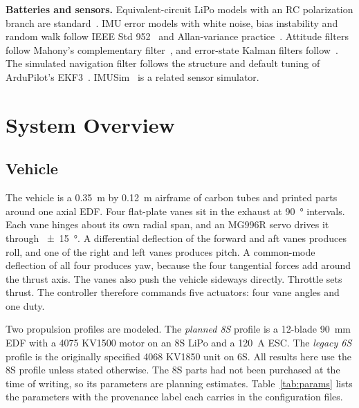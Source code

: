 \documentclass[journal]{IEEEtran}
\newcommand{\reftab}[1]{Table~\ref{#1}}
\begin{document}
\textbf{Batteries and sensors.}
Equivalent-circuit LiPo models with an RC polarization branch are standard~\cite{chen2006battery,plett2015}.
IMU error models with white noise, bias instability and random walk follow IEEE Std 952~\cite{ieee952} and Allan-variance practice~\cite{elsheimy2008allan}.
Attitude filters follow Mahony's complementary filter~\cite{mahony2008}, and error-state Kalman filters follow~\cite{sola2017}.
The simulated navigation filter follows the structure and default tuning of ArduPilot's EKF3~\cite{ardupilot2026ekf3}.
IMUSim~\cite{young2011imusim} is a related sensor simulator.

\section{System Overview}
\label{sec:system}

\subsection{Vehicle}
\label{sec:vehicle}

The vehicle is a \SI{0.35}{\metre} by \SI{0.12}{\metre} airframe of carbon tubes and printed parts around one axial EDF.
Four flat-plate vanes sit in the exhaust at \SI{90}{\degree} intervals.
Each vane hinges about its own radial span, and an MG996R servo drives it through \SI{\pm15}{\degree}.
A differential deflection of the forward and aft vanes produces roll, and one of the right and left vanes produces pitch.
A common-mode deflection of all four produces yaw, because the four tangential forces add around the thrust axis.
The vanes also push the vehicle sideways directly.
Throttle sets thrust.
The controller therefore commands five actuators: four vane angles and one duty.

Two propulsion profiles are modeled.
The \emph{planned 8S} profile is a 12-blade \SI{90}{\milli\metre} EDF with a 4075 KV1500 motor on an 8S LiPo and a \SI{120}{\ampere} ESC.
The \emph{legacy 6S} profile is the originally specified 4068 KV1850 unit on 6S.
All results here use the 8S profile unless stated otherwise.
The 8S parts had not been purchased at the time of writing, so its parameters are planning estimates.
\reftab{tab:params} lists the parameters with the provenance label each carries in the configuration files.
\end{document}
